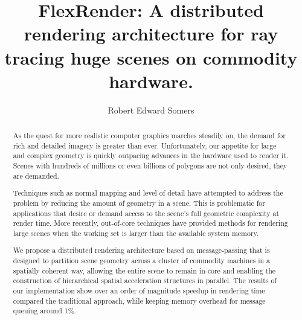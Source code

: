 \documentclass[12pt]{ucthesis}
\begin{document}

\title{FlexRender: A distributed rendering architecture for ray tracing huge
scenes on commodity hardware.}
\author{Robert Edward Somers}
  
 
     



\maketitle

\begin{frontmatter}

\copyrightpage

\committeemembershippage

\begin{abstract}

As the quest for more realistic computer graphics marches steadily on, the
demand for rich and detailed imagery is greater than ever. Unfortunately, our
appetite for large and complex geometry is quickly outpacing advances in the
hardware used to render it. Scenes with hundreds of millions or even billions
of polygons are not only desired, they are demanded.

Techniques such as normal mapping and level of detail have attempted to address
the problem by reducing the amount of geometry in a scene. This is problematic
for applications that desire or demand access to the scene's full geometric
complexity at render time. More recently, out-of-core techniques have provided
methods for rendering large scenes when the working set is larger than the
available system memory.

We propose a distributed rendering architecture based on message-passing that
is designed to partition scene geometry across a cluster of commodity machines
in a spatially coherent way, allowing the entire scene to remain in-core and
enabling the construction of hierarchical spatial acceleration structures in
parallel. The results of our implementation show over an order of magnitude
speedup in rendering time compared the traditional approach, while keeping
memory overhead for message queuing around 1\%.


\end{abstract}
\end{frontmatter}
\end{document}
